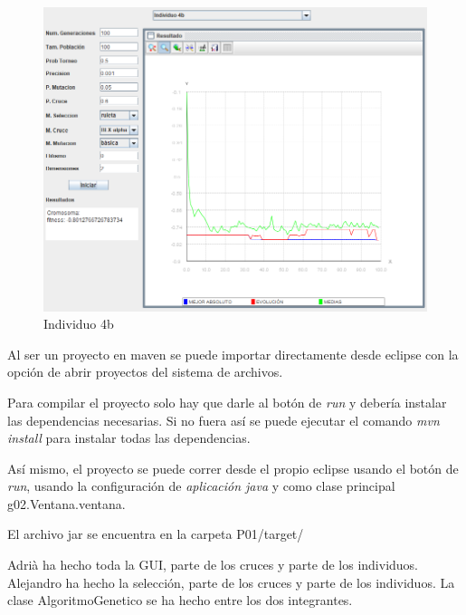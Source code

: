 \documentclass[twoside]{AiTeX}
\begin{document}
\begin{figure}[H]
    \centering
    \includegraphics[width = \textwidth]{Images/Individuo4b.png}
    \caption{Individuo 4b}
\end{figure}


Al ser un proyecto en maven se puede importar directamente desde eclipse con la opción de abrir proyectos del sistema de archivos.

Para compilar el proyecto solo hay que darle al botón de \textit{run} y debería instalar las dependencias necesarias. Si no fuera así se puede ejecutar el comando \textit{mvn install} para instalar todas las dependencias.

Así mismo, el proyecto se puede correr desde el propio eclipse usando el botón de \textit{run}, usando la configuración de \textit{aplicación java} y como clase principal g02.Ventana.ventana.

El archivo jar se encuentra en la carpeta P01/target/



Adrià ha hecho toda la GUI, parte de los cruces y parte de los individuos. Alejandro ha hecho la selección, parte de los cruces y parte de los individuos. La clase AlgoritmoGenetico se ha hecho entre los dos integrantes.
\end{document}
